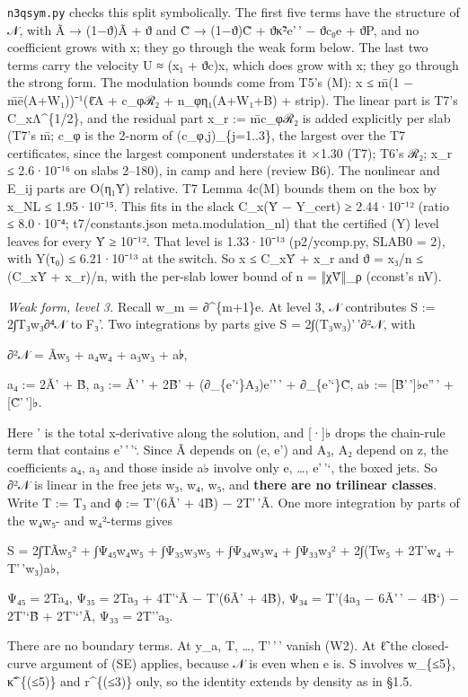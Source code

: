 \documentclass[
]{article}
\begin{document}
\texttt{n3qsym.py} checks this split symbolically. The first five terms
have the structure of 𝒩, with Ã → (1−ϑ)Ã + ϑ and C̃ → (1−ϑ)C̃ + ϑκ̃²e'\,' −
ϑc₀e + ϑP, and no coefficient grows with x; they go through the weak
form below. The last two terms carry the velocity U ≈ (x₁ + ϑc)x, which
does grow with x; they go through the strong form. The modulation bounds
come from T5's (M): \textbar x\textbar{} ≤ m̄(1 − m̄ē(A+W₁))⁻¹(ℓ̄A + c\_φℛ₂
+ n\_φη₁(A+W₁+B) + strip). The linear part is T7's C\_xΛ\^{}\{1/2\}, and
the residual part x\_r := m̄c\_φℛ₂ is added explicitly per slab (T7's m̄;
c\_φ is the 2-norm of (c\_φ,j)\_\{j=1..3\}, the largest over the T7
certificates, since the largest component understates it ×1.30 (T7);
T6's ℛ₂; x\_r ≤ 2.6·10⁻¹⁶ on slabs 2--180), in camp and here (review
B6). The nonlinear and E\_ij parts are O(η₁Ȳ) relative. T7 Lemma 4c(M)
bounds them on the box by x\_NL ≤ 1.95·10⁻¹⁵. This fits in the slack
C\_x(Ȳ − Y\_cert) ≥ 2.44·10⁻¹² (ratio ≤ 8.0·10⁻⁴; t7/constants.json
meta.modulation\_nl) that the certified (Y) level leaves for every Ȳ ≥
10⁻¹². That level is 1.33·10⁻¹³ (p2/ycomp.py, SLAB0 = 2), with Y(τ₀) ≤
6.21·10⁻¹³ at the switch. So \textbar x\textbar{} ≤ C\_xȲ + x\_r and
\textbar ϑ\textbar{} = \textbar x₃\textbar/n ≤ (C\_xȲ + x\_r)/n, with
the per-slab lower bound of n = ‖χṼ‖\_ρ (cconst's nV).

\emph{Weak form, level 3.} Recall w\_m = ∂\^{}\{m+1\}e. At level 3, 𝒩
contributes S := 2∫T₃w₃∂⁴𝒩 to F₃'. Two integrations by parts give S =
2∫(T₃w₃)'\,'∂²𝒩, with

∂²𝒩 = Ãw₅ + a₄w₄ + a₃w₃ + a♭,

a₄ := 2Ã' + B̃, a₃ := Ã'\,' + 2B̃' + (∂\_\{e'`\}A₃)e''\,' + ∂\_\{e'`\}C̃,
a♭ := {[}B̃'\,'{]}♭e''\,' + {[}C̃'\,'{]}♭.

Here ' is the total x-derivative along the solution, and {[}·{]}♭ drops
the chain-rule term that contains e'\,'\,'`. Since Ã depends on (e, e')
and A₃, A₂ depend on z, the coefficients a₄, a₃ and those inside a♭
involve only e, \ldots, e'\,'`, the boxed jets. So ∂²𝒩 is linear in the
free jets w₃, w₄, w₅, and \textbf{there are no trilinear classes}. Write
T := T₃ and ϕ := T'(6Ã' + 4B̃) − 2T'\,'Ã. One more integration by parts
of the w₄w₅- and w₄²-terms gives

S = 2∫TÃw₅² + ∫Ψ₄₅w₄w₅ + ∫Ψ₃₅w₃w₅ + ∫Ψ₃₄w₃w₄ + ∫Ψ₃₃w₃² + 2∫(Tw₅ + 2T'w₄
+ T'\,'w₃)a♭,

Ψ₄₅ = 2Ta₄, Ψ₃₅ = 2Ta₃ + 4T'`Ã − T'(6Ã' + 4B̃), Ψ₃₄ = T'(4a₃ − 6Ã'\,' −
4B̃`) − 2T'`B̃ + 2T'`'Ã, Ψ₃₃ = 2T''a₃.

There are no boundary terms. At y\_a, T, \ldots, T'\,'\,' vanish (W2).
At ℓ̃ the closed-curve argument of (SE) applies, because 𝒩 is even when e
is. S involves w\_\{≤5\}, κ̃\^{}\{(≤5)\} and r\^{}\{(≤3)\} only, so the
identity extends by density as in §1.5.
\end{document}
